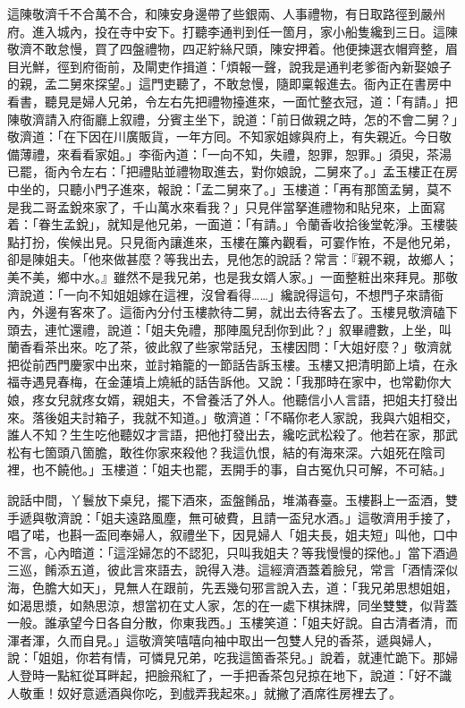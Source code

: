 這陳敬濟千不合萬不合，和陳安身邊帶了些銀兩、人事禮物，有日取路徑到嚴州府。{}進入城內，投在寺中安下。打聽李通判到任一箇月，家小船隻纔到三日。這陳敬濟不敢怠慢，買了四盤禮物，四疋紵絲尺頭，陳安押着。他便揀選衣帽齊整，眉目光鮮，徑到府衙前，及閘吏作揖道：「煩報一聲，說我是通判老爹衙內新娶娘子的親，孟二舅來探望。」這門吏聽了，不敢怠慢，隨即稟報進去。衙內正在書房中看書，聽見是婦人兄弟，令左右先把禮物擡進來，一面忙整衣冠，道：「有請。」把陳敬濟請入府衙廳上叙禮，分賓主坐下，說道：「前日做親之時，怎的不會二舅？」敬濟道：「在下因在川廣販貨，一年方囘。不知家姐嫁與府上，有失親近。今日敬備薄禮，來看看家姐。」李衙內道：「一向不知，失禮，恕罪，恕罪。」須臾，茶湯已罷，衙內令左右：「把禮貼並禮物取進去，對你娘說，二舅來了。」孟玉樓正在房中坐的，只聽小門子進來，報說：「孟二舅來了。」玉樓道：「再有那箇孟舅，莫不是我二哥孟銳來家了，千山萬水來看我？」只見伴當拏進禮物和貼兒來，上面寫着：「眷生孟銳」，就知是他兄弟，一面道：「有請。」令蘭香收拾後堂乾淨。玉樓裝點打扮，俟候出見。只見衙內讓進來，玉樓在簾內觀看，可霎作恠，不是他兄弟，卻是陳姐夫。「他來做甚麼？等我出去，見他怎的說話？常言：『親不親，故鄉人；美不美，鄉中水。』雖然不是我兄弟，也是我女婿人家。」一面整粧出來拜見。那敬濟說道：「一向不知姐姐嫁在這裡，沒曾看得……」纔說得這句，不想門子來請衙內，外邊有客來了。這衙內分付玉樓款待二舅，就出去待客去了。玉樓見敬濟磕下頭去，連忙還禮，說道：「姐夫免禮，那陣風兒刮你到此？」叙畢禮數，上坐，叫蘭香看茶出來。吃了茶，彼此叙了些家常話兒，玉樓因問：「大姐好麼？」敬濟就把從前西門慶家中出來，並討箱籠的一節話告訴玉樓。玉樓又把清明節上墳，在永福寺遇見春梅，在金蓮墳上燒紙的話告訴他。又說：「我那時在家中，也常勸你大娘，疼女兒就疼女婿，親姐夫，不曾養活了外人。他聽信小人言語，把姐夫打發出來。落後姐夫討箱子，我就不知道。」敬濟道：「不瞞你老人家說，我與六姐相交，誰人不知？{}生生吃他聽奴才言語，把他打發出去，纔吃武松殺了。他若在家，那武松有七箇頭八箇膽，敢徃你家來殺他？我這仇恨，結的有海來深。六姐死在陰司裡，也不饒他。」玉樓道：「姐夫也罷，丟開手的事，自古冤仇只可解，不可結。」

說話中間，丫鬟放下桌兒，擺下酒來，盃盤餚品，堆滿春臺。玉樓斟上一盃酒，雙手遞與敬濟說：「姐夫遠路風塵，無可破費，且請一盃兒水酒。」這敬濟用手接了，唱了喏，也斟一盃囘奉婦人，叙禮坐下，因見婦人「姐夫長，姐夫短」叫他，口中不言，心內暗道：「這淫婦怎的不認犯，只叫我姐夫？等我慢慢的探他。」當下酒過三巡，餚添五道，彼此言來語去，說得入港。這經濟酒蓋着臉兒，常言「酒情深似海，色膽大如天」，見無人在跟前，先丟幾句邪言說入去，道：「我兄弟思想姐姐，如渴思漿，如熱思涼，想當初在丈人家，怎的在一處下棋抹牌，同坐雙雙，似背蓋一般。誰承望今日各自分散，你東我西。」{}玉樓笑道：「姐夫好說。自古清者清，而渾者渾，久而自見。」這敬濟笑嘻嘻向袖中取出一包雙人兒的香茶，遞與婦人，說：「姐姐，你若有情，可憐見兄弟，吃我這箇香茶兒。」說着，就連忙跪下。那婦人登時一點紅從耳畔起，把臉飛紅了，一手把香茶包兒掠在地下，說道：「好不識人敬重！奴好意遞酒與你吃，到戲弄我起來。」就撇了酒席徃房裡去了。

